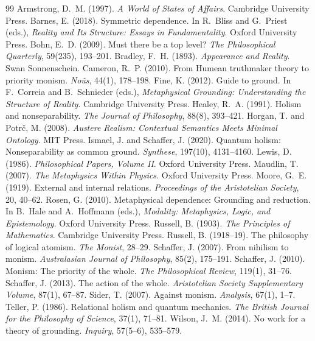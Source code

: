 \documentclass{situationist-preprint}
\begin{document}
\begin{thebibliography}{99}\small
{} Armstrong, D.~M. (1997). \emph{A World of States of Affairs}. Cambridge University Press.
 Barnes, E. (2018). Symmetric dependence. In R.~Bliss and G.~Priest (eds.), \emph{Reality and Its Structure: Essays in Fundamentality}. Oxford University Press.
 Bohn, E.~D. (2009). Must there be a top level? \emph{The Philosophical Quarterly}, 59(235), 193--201.
 Bradley, F.~H. (1893). \emph{Appearance and Reality}. Swan Sonnenschein.
 Cameron, R.~P. (2010). From Humean truthmaker theory to priority monism. \emph{No\^us}, 44(1), 178--198.
 Fine, K. (2012). Guide to ground. In F.~Correia and B.~Schnieder (eds.), \emph{Metaphysical Grounding: Understanding the Structure of Reality}. Cambridge University Press.
 Healey, R.~A. (1991). Holism and nonseparability. \emph{The Journal of Philosophy}, 88(8), 393--421.
 Horgan, T. and Potr\v{c}, M. (2008). \emph{Austere Realism: Contextual Semantics Meets Minimal Ontology}. MIT Press.
 Ismael, J. and Schaffer, J. (2020). Quantum holism: Nonseparability as common ground. \emph{Synthese}, 197(10), 4131--4160.
 Lewis, D. (1986). \emph{Philosophical Papers, Volume II}. Oxford University Press.
 Maudlin, T. (2007). \emph{The Metaphysics Within Physics}. Oxford University Press.
 Moore, G.~E. (1919). External and internal relations. \emph{Proceedings of the Aristotelian Society}, 20, 40--62.
 Rosen, G. (2010). Metaphysical dependence: Grounding and reduction. In B.~Hale and A.~Hoffmann (eds.), \emph{Modality: Metaphysics, Logic, and Epistemology}. Oxford University Press.
 Russell, B. (1903). \emph{The Principles of Mathematics}. Cambridge University Press.
 Russell, B. (1918--19). The philosophy of logical atomism. \emph{The Monist}, 28--29.
 Schaffer, J. (2007). From nihilism to monism. \emph{Australasian Journal of Philosophy}, 85(2), 175--191.
 Schaffer, J. (2010). Monism: The priority of the whole. \emph{The Philosophical Review}, 119(1), 31--76.
 Schaffer, J. (2013). The action of the whole. \emph{Aristotelian Society Supplementary Volume}, 87(1), 67--87.
 Sider, T. (2007). Against monism. \emph{Analysis}, 67(1), 1--7.
 Teller, P. (1986). Relational holism and quantum mechanics. \emph{The British Journal for the Philosophy of Science}, 37(1), 71--81.
 Wilson, J.~M. (2014). No work for a theory of grounding. \emph{Inquiry}, 57(5--6), 535--579.
\end{thebibliography}
\end{document}
